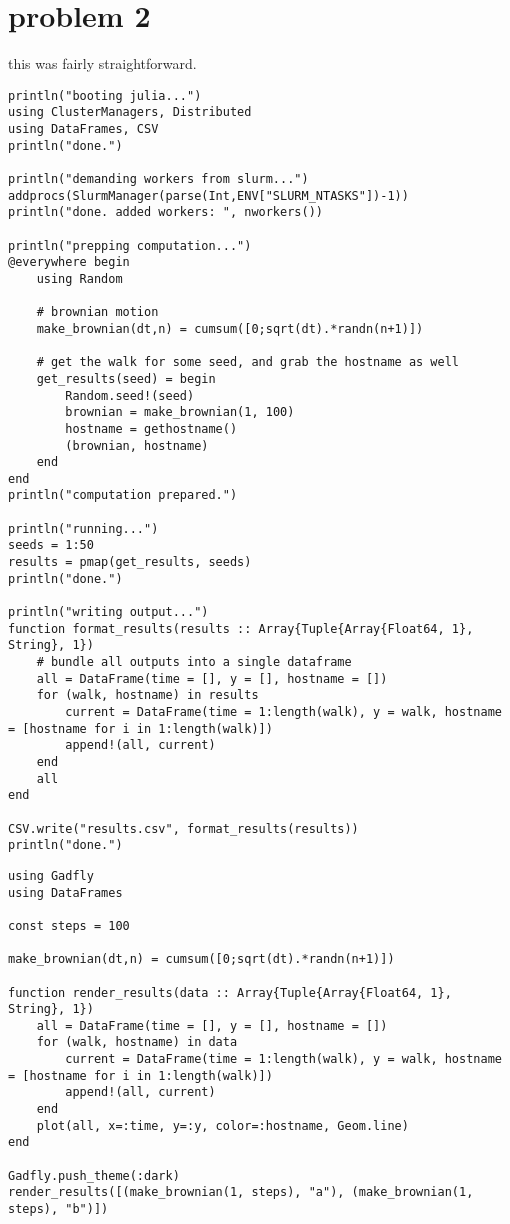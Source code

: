 \documentclass[nobib]{tufte-handout}
\begin{document}
\section{problem 2}
\label{sec:org4af8ee4}

this was fairly straightforward.

\begin{verbatim}
println("booting julia...")
using ClusterManagers, Distributed
using DataFrames, CSV
println("done.")

println("demanding workers from slurm...")
addprocs(SlurmManager(parse(Int,ENV["SLURM_NTASKS"])-1))
println("done. added workers: ", nworkers())

println("prepping computation...")
@everywhere begin
    using Random

    # brownian motion
    make_brownian(dt,n) = cumsum([0;sqrt(dt).*randn(n+1)])

    # get the walk for some seed, and grab the hostname as well
    get_results(seed) = begin
        Random.seed!(seed)
        brownian = make_brownian(1, 100)
        hostname = gethostname()
        (brownian, hostname)
    end
end
println("computation prepared.")

println("running...")
seeds = 1:50
results = pmap(get_results, seeds)
println("done.")

println("writing output...")
function format_results(results :: Array{Tuple{Array{Float64, 1}, String}, 1})
    # bundle all outputs into a single dataframe
    all = DataFrame(time = [], y = [], hostname = [])
    for (walk, hostname) in results
        current = DataFrame(time = 1:length(walk), y = walk, hostname = [hostname for i in 1:length(walk)])
        append!(all, current)
    end
    all
end

CSV.write("results.csv", format_results(results))
println("done.")

\end{verbatim}




\begin{verbatim}
using Gadfly
using DataFrames

const steps = 100

make_brownian(dt,n) = cumsum([0;sqrt(dt).*randn(n+1)])

function render_results(data :: Array{Tuple{Array{Float64, 1}, String}, 1})
    all = DataFrame(time = [], y = [], hostname = [])
    for (walk, hostname) in data
        current = DataFrame(time = 1:length(walk), y = walk, hostname = [hostname for i in 1:length(walk)])
        append!(all, current)
    end
    plot(all, x=:time, y=:y, color=:hostname, Geom.line)
end

Gadfly.push_theme(:dark)
render_results([(make_brownian(1, steps), "a"), (make_brownian(1, steps), "b")])
\end{verbatim}
\end{document}
